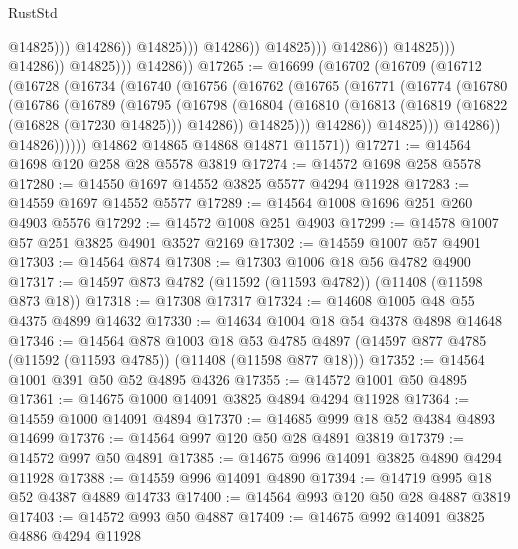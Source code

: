 \begin{lexlean}{RustStd}
\begin{coremodule}
                                                      @14825)))
                                                @14286))
                                            @14825)))
                                      @14286))
                                  @14825)))
                            @14286))
                        @14825)))
                  @14286))
              @14825)))
        @14286))
@17265 := @16699
    (@16702
      (@16709
        (@16712
          (@16728
            (@16734
              (@16740
                (@16756
                  (@16762
                    (@16765
                      (@16771
                        (@16774
                          (@16780
                            (@16786
                              (@16789
                                (@16795
                                  (@16798
                                    (@16804
                                      (@16810
                                        (@16813 (@16819 (@16822 (@16828 (@17230 @14825))) @14286))
                                        @14825)))
                                  @14286))
                              @14825)))
                        @14286))
                    @14826))))))
        @14862
        @14865
        @14868
        @14871
        @11571))
@17271 := @14564 @1698 @120 @258 @28 @5578 @3819
@17274 := @14572 @1698 @258 @5578
@17280 := @14550 @1697 @14552 @3825 @5577 @4294 @11928
@17283 := @14559 @1697 @14552 @5577
@17289 := @14564 @1008 @1696 @251 @260 @4903 @5576
@17292 := @14572 @1008 @251 @4903
@17299 := @14578 @1007 @57 @251 @3825 @4901 @3527 @2169
@17302 := @14559 @1007 @57 @4901
@17303 := @14564 @874
@17308 := @17303 @1006 @18 @56 @4782 @4900
@17317 := @14597 @873 @4782 (@11592 (@11593 @4782)) (@11408 (@11598 @873 @18))
@17318 := @17308 @17317
@17324 := @14608 @1005 @48 @55 @4375 @4899 @14632
@17330 := @14634 @1004 @18 @54 @4378 @4898 @14648
@17346 := @14564
    @878
    @1003
    @18
    @53
    @4785
    @4897
    (@14597 @877 @4785 (@11592 (@11593 @4785)) (@11408 (@11598 @877 @18)))
@17352 := @14564 @1001 @391 @50 @52 @4895 @4326
@17355 := @14572 @1001 @50 @4895
@17361 := @14675 @1000 @14091 @3825 @4894 @4294 @11928
@17364 := @14559 @1000 @14091 @4894
@17370 := @14685 @999 @18 @52 @4384 @4893 @14699
@17376 := @14564 @997 @120 @50 @28 @4891 @3819
@17379 := @14572 @997 @50 @4891
@17385 := @14675 @996 @14091 @3825 @4890 @4294 @11928
@17388 := @14559 @996 @14091 @4890
@17394 := @14719 @995 @18 @52 @4387 @4889 @14733
@17400 := @14564 @993 @120 @50 @28 @4887 @3819
@17403 := @14572 @993 @50 @4887
@17409 := @14675 @992 @14091 @3825 @4886 @4294 @11928

\end{coremodule}
\end{lexlean}
